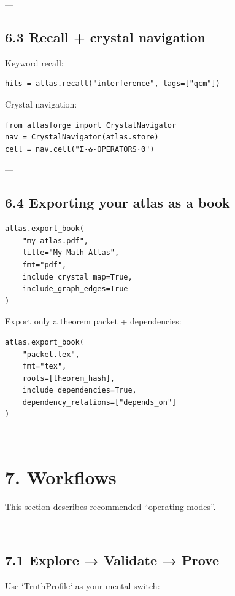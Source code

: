 \documentclass[11pt]{article}
\begin{document}
---

\subsection{6.3 Recall + crystal navigation}

Keyword recall:

\begin{lstlisting}
hits = atlas.recall("interference", tags=["qcm"])
\end{lstlisting}

Crystal navigation:

\begin{lstlisting}
from atlasforge import CrystalNavigator
nav = CrystalNavigator(atlas.store)
cell = nav.cell("Σ·✿·OPERATORS·0")
\end{lstlisting}

---

\subsection{6.4 Exporting your atlas as a book}

\begin{lstlisting}
atlas.export_book(
    "my_atlas.pdf",
    title="My Math Atlas",
    fmt="pdf",
    include_crystal_map=True,
    include_graph_edges=True
)
\end{lstlisting}

Export only a theorem packet + dependencies:

\begin{lstlisting}
atlas.export_book(
    "packet.tex",
    fmt="tex",
    roots=[theorem_hash],
    include_dependencies=True,
    dependency_relations=["depends_on"]
)
\end{lstlisting}

---

\section{7. Workflows}

This section describes recommended “operating modes”.

---

\subsection{7.1 Explore → Validate → Prove}

Use `TruthProfile` as your mental switch:
\end{document}
